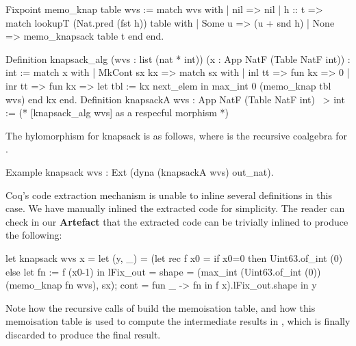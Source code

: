 \documentclass[ a4paper, UKenglish, cleveref, autoref, thm-restate]{lipics-v2021}
\begin{document}
\begin{coqcode}
Fixpoint memo_knap table wvs :=
  match wvs with | nil => nil | h :: t =>
      match lookupT (Nat.pred (fst h)) table with
      | Some u => (u + snd h)%
      | None => memo_knapsack table t
      end
  end.

Definition knapsack_alg (wvs : list (nat * int))
  (x : App NatF (Table NatF int)) : int :=
  match x with | MkCont sx kx => match sx with
  | inl tt => fun kx => 0%
  | inr tt => fun kx => let tbl := kx next_elem in max_int 0 (memo_knap tbl wvs)
  end kx end.
Definition knapsackA wvs : App NatF (Table NatF int) ~> int := 
  (* [knapsack_alg wvs] as a respecful morphism *)
\end{coqcode}
The hylomorphism for knapsack is as follows, where  is the
recursive coalgebra for .
\begin{coqcode}
Example knapsack wvs : Ext (dyna (knapsackA wvs) out_nat).
\end{coqcode}
Coq's code extraction mechanism is unable to inline several definitions in this
case. We have manually inlined the extracted code for simplicity. The reader
can check in our \textbf{Artefact} that the extracted code can be trivially
inlined to produce the following:
\begin{ocamlcode}
let knapsack wvs x =
  let (y, _) =
    (let rec f x0 =
      if x0=0 then Uint63.of_int (0)
      else let fn := f (x0-1) in { lFix_out = { 
           shape = (max_int (Uint63.of_int (0)) (memo_knap fn wvs), sx);
           cont = fun _ -> fn } }
     in f x).lFix_out.shape
  in y
\end{ocamlcode}
Note how the recursive calls of  build the memoisation table, and how
this memoisation table is used to compute the intermediate results in
, which is finally discarded to produce the final result.
\end{document}
